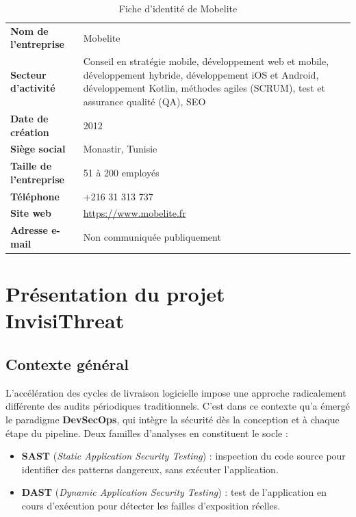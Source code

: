 \begin{table}[H]
\centering
\caption{Fiche d'identité de Mobelite}
\renewcommand{\arraystretch}{1.4}
\begin{tabularx}{\textwidth}{>{\bfseries}l X}
\hline
Nom de l'entreprise & Mobelite \\

Secteur d'activité &
Conseil en stratégie mobile, développement web et mobile, développement hybride, développement iOS et Android, développement Kotlin, méthodes agiles (SCRUM), test et assurance qualité (QA), SEO \\

Date de création & 2012 \\

Siège social &
Monastir, Tunisie \\

Taille de l'entreprise &
51 à 200 employés \\

Téléphone &
+216 31 313 737 \\

Site web &
\url{https://www.mobelite.fr} \\

Adresse e-mail &
Non communiquée publiquement \\

\hline
\end{tabularx}
\end{table}

\section{Présentation du projet InvisiThreat}

\subsection{Contexte général}

L'accélération des cycles de livraison logicielle impose une approche radicalement différente des audits périodiques traditionnels. C'est dans ce contexte qu'a émergé le paradigme \textbf{DevSecOps}, qui intègre la sécurité dès la conception et à chaque étape du pipeline. Deux familles d'analyses en constituent le socle :

\begin{itemize}
  \item \textbf{SAST} (\textit{Static Application Security Testing}) : inspection du code source pour identifier des patterns dangereux, sans exécuter l'application.
  \item \textbf{DAST} (\textit{Dynamic Application Security Testing}) : test de l'application en cours d'exécution pour détecter les failles d'exposition réelles.
\end{itemize}


